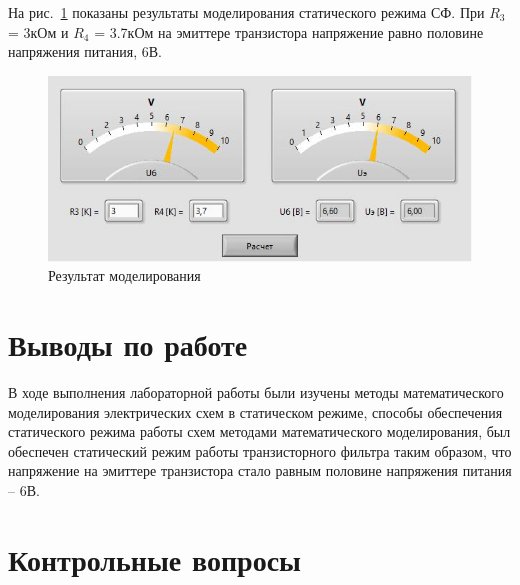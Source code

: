 \documentclass[a4paper,14pt]{article}
\begin{document}
На рис.~\ref{fig:work2} показаны результаты моделирования статического режима СФ.
При $R_3$ = 3кОм и $R_4$ = 3.7кОм на эмиттере транзистора напряжение равно половине напряжения питания, 6В.

\begin{figure}[H]
	\centering
	\includegraphics[width=0.7\linewidth]{image/work2}
	\caption{Результат моделирования}
	\label{fig:work2}
\end{figure}


\section{Выводы по работе}

В ходе выполнения лабораторной работы были изучены методы математического моделирования электрических схем в статическом режиме, способы обеспечения статического режима работы схем методами математического моделирования, был обеспечен статический режим работы транзисторного фильтра таким образом, что напряжение на эмиттере транзистора стало равным половине напряжения питания – 6В.
\section{Контрольные вопросы}
\end{document}
